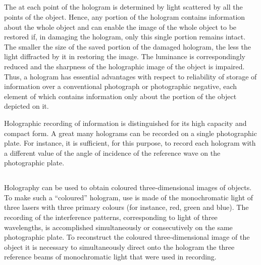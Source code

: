 \subsection{}\label{33.6.3} The  at each point of the hologram is determined by light scattered by all the points of the object. Hence, any portion of the hologram contains information about the whole object and can enable the image of the whole object to be restored if, in damaging the hologram, only this single portion remains intact. The smaller the size of the saved portion of the damaged hologram, the less the light diffracted by it in restoring the image. The luminance is correspondingly reduced and the sharpness of the holographic image of the object is impaired. Thus, a hologram has essential advantages with respect to reliability of storage of information over a conventional photograph or photographic negative, each element of which contains information only about the portion of the object depicted on it.

Holographic recording of information is distinguished for its
high capacity and compact form. A great many holograms can
be recorded on a single photographic plate. For instance, it is sufficient, for this purpose, to record each hologram with
a different value of the angle of incidence of the reference wave on the photographic plate.

\subsection{}\label{33.6.4} Holography can be used to obtain coloured three-dimensional images of objects. To make such a ``coloured'' hologram, use is made of the monochromatic light of three lasers with three primary colours (for instance, red, green and blue). The recording of the interference patterns, corresponding to light of three wavelengths, is accomplished simultaneously or consecutively on the same photographic plate. To reconstruct the coloured three-dimensional image of the object it is necessary to simultaneously direct onto the hologram the three reference beams of monochromatic light that were used in recording.

